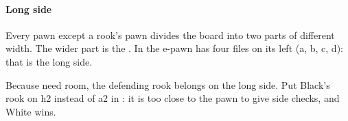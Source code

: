 \paragraph{Long side}\label{long-side}

Every pawn except a rook's pawn divides the board into two parts of different width. The wider
part is the
.
In  the e-pawn has four files on its left (a, b, c, d): that is
the long side.

Because  need room, the defending rook belongs on the long
side. Put Black's rook on h2 instead of a2 in : it is too close to
the pawn to give side checks, and White wins.
